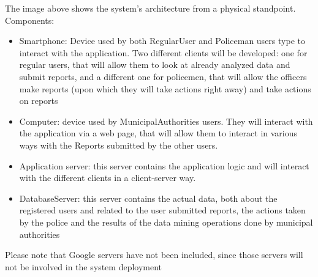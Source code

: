 The image above shows the system's architecture from a physical standpoint.
Components:
\begin{itemize}
\item Smartphone: Device used by both RegularUser and Policeman users type to interact with the application. Two different clients will be developed: one for regular users, that will allow them to look at already analyzed data and submit reports, and a different one for policemen, that will allow the officers make reports (upon which they will take actions right away) and take actions on reports
\item Computer: device used by MunicipalAuthorities users. They will interact with the application via a web page, that will allow them to interact in various ways with the Reports submitted by the other users.
\item Application server: this server contains the application logic and will interact with the different clients in a client-server way.
\item DatabaseServer: this server contains the actual data, both about the registered users and related to the user submitted reports, the actions taken by the police and the results of the data mining operations done by municipal authorities
\end{itemize}
Please note that Google servers have not been included, since those servers will not be involved in the system deployment

